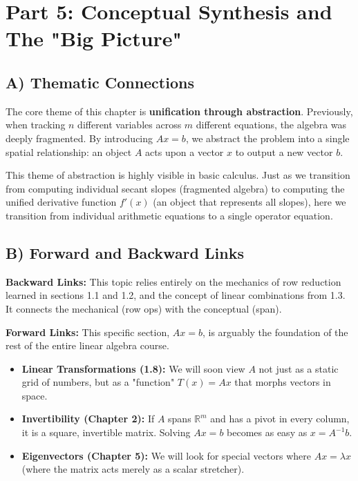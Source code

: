 \documentclass{article}
\begin{document}
\newpage
\section{Part 5: Conceptual Synthesis and The "Big Picture"}

\subsection{A) Thematic Connections}
The core theme of this chapter is \textbf{unification through abstraction}. Previously, when tracking $n$ different variables across $m$ different equations, the algebra was deeply fragmented. By introducing $Ax = b$, we abstract the problem into a single spatial relationship: an object $A$ acts upon a vector $x$ to output a new vector $b$. 

This theme of abstraction is highly visible in basic calculus. Just as we transition from computing individual secant slopes (fragmented algebra) to computing the unified derivative function $f'(x)$ (an object that represents all slopes), here we transition from individual arithmetic equations to a single operator equation.

\subsection{B) Forward and Backward Links}
\textbf{Backward Links:} This topic relies entirely on the mechanics of row reduction learned in sections 1.1 and 1.2, and the concept of linear combinations from 1.3. It connects the mechanical (row ops) with the conceptual (span).

\textbf{Forward Links:} 
This specific section, $Ax = b$, is arguably the foundation of the rest of the entire linear algebra course.
\begin{itemize}
    \item \textbf{Linear Transformations (1.8):} We will soon view $A$ not just as a static grid of numbers, but as a "function" $T(x) = Ax$ that morphs vectors in space.
    \item \textbf{Invertibility (Chapter 2):} If $A$ spans $\mathbb{R}^m$ and has a pivot in every column, it is a square, invertible matrix. Solving $Ax = b$ becomes as easy as $x = A^{-1}b$.
    \item \textbf{Eigenvectors (Chapter 5):} We will look for special vectors where $Ax = \lambda x$ (where the matrix acts merely as a scalar stretcher). 
\end{itemize}
\end{document}
